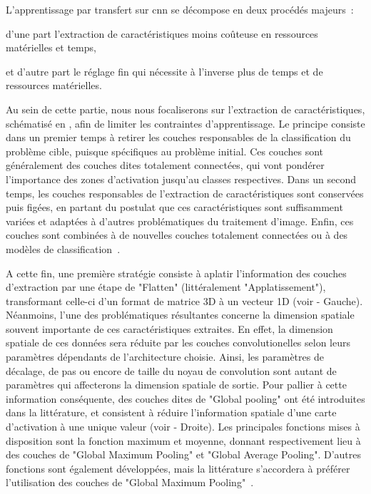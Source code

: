 L'apprentissage par transfert sur \gls{cnn} se décompose en deux procédés majeurs~: 
\begin{inlinerate}
    \item d'une part l'extraction de caractéristiques moins coûteuse en ressources matérielles et temps,
    \item et d'autre part le réglage fin qui nécessite à l'inverse plus de temps et de ressources matérielles. 
\end{inlinerate}
Au sein de cette partie, nous nous focaliserons sur l'extraction de caractéristiques, schématisé en , afin de limiter les contraintes d'apprentissage. Le principe consiste dans un premier temps à retirer les couches responsables de la classification du problème cible, puisque spécifiques au problème initial. Ces couches sont généralement des couches dites totalement connectées, qui vont pondérer l'importance des zones d'activation jusqu'au classes respectives. Dans un second temps, les couches responsables de l'extraction de caractéristiques sont conservées puis figées, en partant du postulat que ces caractéristiques sont suffisamment variées et adaptées à d'autres problématiques du traitement d'image. Enfin, ces couches sont combinées à de nouvelles couches totalement connectées ou à des modèles de classification~\cite{Litjens2017}.\par 

A cette fin, une première stratégie consiste à aplatir l'information des couches d'extraction par une étape de "Flatten" (littéralement "Applatissement"), transformant celle-ci d'un format de matrice 3D à un vecteur 1D (voir  - Gauche). Néanmoins, l'une des problématiques résultantes concerne la dimension spatiale souvent importante de ces caractéristiques extraites. En effet, la dimension spatiale de ces données sera réduite par les couches convolutionelles selon leurs paramètres dépendants de l'architecture choisie. Ainsi, les paramètres de décalage, de pas ou encore de taille du noyau de convolution sont autant de paramètres qui affecterons la dimension spatiale de sortie. Pour pallier à cette information conséquente, des couches dites de "Global pooling" ont été introduites dans la littérature, et consistent à réduire l'information spatiale d'une carte d'activation à une unique valeur (voir  - Droite). Les principales fonctions mises à disposition sont la fonction maximum et moyenne, donnant respectivement lieu à des couches de "Global Maximum Pooling" et "Global Average Pooling". D'autres fonctions sont également développées, mais la littérature s'accordera à préférer l'utilisation des couches de "Global Maximum Pooling"~\cite{christlein2019}.\par

